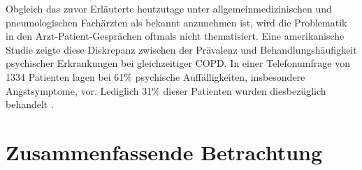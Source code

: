 Obgleich das zuvor Erläuterte heutzutage unter allgemeinmedizinischen und pneumologischen Fachärzten als bekannt anzunehmen ist, wird die Problematik in den Arzt-Patient-Gesprächen oftmals nicht thematisiert. Eine amerikanische Studie zeigte diese Diskrepanz zwischen der Prävalenz und Behandlungshäufigkeit psychischer Erkrankungen bei gleichzeitiger COPD. In einer Telefonumfrage von 1334 Patienten lagen bei 61\% psychische Auffälligkeiten, insbesondere Angstsymptome, vor. Lediglich 31\% dieser Patienten wurden diesbezüglich behandelt \autocite[vgl.][156]{fischer2007}.


\section{Zusammenfassende Betrachtung}
\label{zusammenfassende betrachtung}

\newpage\thispagestyle{empty}